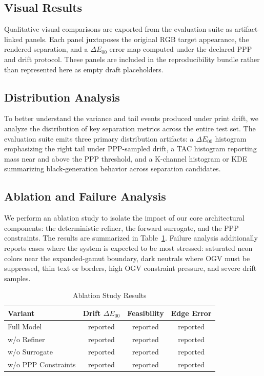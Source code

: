 \documentclass[acmsmall,screen,nonacm]{acmart}
\begin{document}
\subsection{Visual Results}

Qualitative visual comparisons are exported from the evaluation suite as artifact-linked panels. Each panel juxtaposes the original RGB target appearance, the rendered separation, and a $\Delta E_{00}$ error map computed under the declared PPP and drift protocol. These panels are included in the reproducibility bundle rather than represented here as empty draft placeholders.

\subsection{Distribution Analysis}

To better understand the variance and tail events produced under print drift, we analyze the distribution of key separation metrics across the entire test set. The evaluation suite emits three primary distribution artifacts: a $\Delta E_{00}$ histogram emphasizing the right tail under PPP-sampled drift, a TAC histogram reporting mass near and above the PPP threshold, and a K-channel histogram or KDE summarizing black-generation behavior across separation candidates.

\subsection{Ablation and Failure Analysis}

We perform an ablation study to isolate the impact of our core architectural components: the deterministic refiner, the forward surrogate, and the PPP constraints. The results are summarized in Table~\ref{tab:ablation}. Failure analysis additionally reports cases where the system is expected to be most stressed: saturated neon colors near the expanded-gamut boundary, dark neutrals where OGV must be suppressed, thin text or borders, high OGV constraint pressure, and severe drift samples.

\begin{table}[htbp]
\centering
\caption{Ablation Study Results}
\label{tab:ablation}
\begin{tabular}{lccc}
\toprule
Variant & Drift $\Delta E_{00}$ & Feasibility & Edge Error \\
\midrule
Full Model & reported & reported & reported \\
w/o Refiner & reported & reported & reported \\
w/o Surrogate & reported & reported & reported \\
w/o PPP Constraints & reported & reported & reported \\
\bottomrule
\end{tabular}
\end{table}
\end{document}
